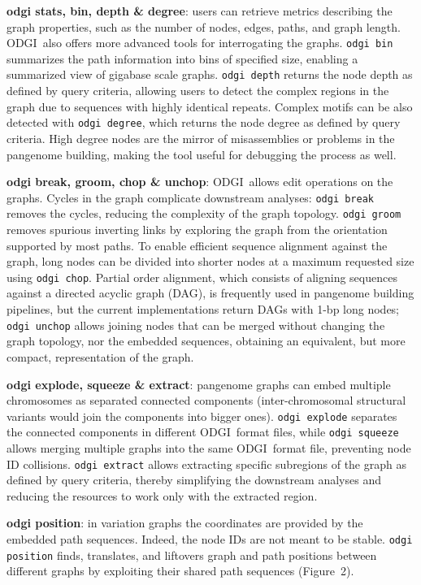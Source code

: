 \documentclass{bioinfo}
\newcommand{\odgi}{ODGI}
\newcommand{\cmd}[1]{{\texttt{#1}}}
\newcommand{\cmdbf}[1]{{\textbf{#1}}}
\newcommand{\topic}[1]{{\cmdbf{#1}}:}
\begin{document}
    \topic{odgi stats, bin, depth \& degree} users can retrieve metrics describing the graph properties, such as the number of
    nodes, edges, paths, and graph length. \odgi\ also offers more advanced tools for interrogating the graphs.
    \cmd{odgi bin} summarizes the path information into bins of specified size, enabling a summarized view of
    gigabase scale graphs. \cmd{odgi depth} returns the node depth as defined by query criteria, allowing users to
    detect the complex regions in the graph due to sequences with highly identical repeats. Complex motifs can be also
    detected with \cmd{odgi degree}, which returns the node degree as defined by query criteria. High degree nodes
    are the mirror of misassemblies or problems in the pangenome building, making the tool useful for debugging the
    process as well.

    \topic{odgi break, groom, chop \& unchop} \odgi\ allows edit operations on the graphs. Cycles in the graph
    complicate downstream analyses: \cmd{odgi break} removes the cycles, reducing the complexity of the graph topology.
    \cmd{odgi groom} removes spurious inverting links by exploring the graph from the orientation supported by most
    paths. To enable efficient sequence alignment against the graph, long nodes can be divided into shorter nodes
    at a maximum requested size using \cmd{odgi chop}. Partial order alignment, which consists of aligning sequences
    against a directed acyclic graph (DAG), is frequently used in pangenome building pipelines, but the current
    implementations return DAGs with 1-bp long nodes; \cmd{odgi unchop} allows joining nodes that can be merged
    without changing the graph topology, nor the embedded sequences, obtaining an equivalent, but more compact,
    representation of the graph.

    \topic{odgi explode, squeeze \& extract} pangenome graphs can embed multiple chromosomes as separated connected
    components (inter-chromosomal structural variants would join the components into bigger ones).
    \cmd{odgi explode} separates the connected components in different \odgi\ format files, while \cmd{odgi squeeze}
    allows merging multiple graphs into the same \odgi\ format file, preventing node ID collisions. \cmd{odgi extract}
    allows extracting specific subregions of the graph as defined by query criteria, thereby simplifying the downstream
    analyses and reducing the resources to work only with the extracted region.

    \topic{odgi position} in variation graphs the coordinates are provided by the embedded path sequences. Indeed, the node
    IDs are not meant to be stable. \cmd{odgi position} finds, translates, and liftovers graph and path positions between
    different graphs by exploiting their shared path sequences (Figure~2\vphantom{\ref{fig:2}}).
\end{document}
